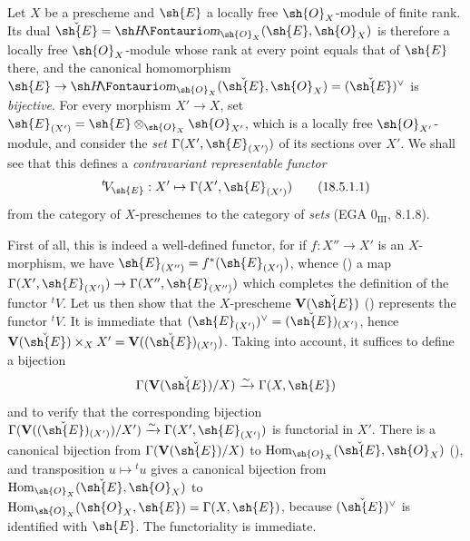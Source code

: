 \begin{env}[18.5.1]
\label{IV.18.5.1}
Let $X$ be a prescheme and $\sh{E}$ a locally free $\sh{O}_X$-module of finite rank.
Its dual $\check{\sh{E}}=\shHom_{\sh{O}_X}(\sh{E},\sh{O}_X)$ is therefore a locally free $\sh{O}_X$-module whose rank at every point equals that of $\sh{E}$ there, and the canonical homomorphism $\sh{E}\to\shHom_{\sh{O}_X}(\check{\sh{E}},\sh{O}_X)=(\check{\sh{E}})^\vee$ is \emph{bijective}.
For every morphism $X'\to X$, set $\sh{E}_{(X')}=\sh{E}\otimes_{\sh{O}_X}\sh{O}_{X'}$, which is a locally free $\sh{O}_{X'}$-module, and consider the \emph{set} $\Gamma(X',\sh{E}_{(X')})$ of its sections over $X'$.
We shall see that this defines a \emph{contravariant representable functor}
\[
\label{IV.18.5.1.1}
{}^t\! V_{\sh{E}}:X'\mapsto\Gamma(X',\sh{E}_{(X')})
\tag{18.5.1.1}
\]
from the category of $X$-preschemes to the category of \emph{sets} (EGA $0_{\mathrm{III}}$, 8.1.8).

First of all, this is indeed a well-defined functor, for if $f:X''\to X'$ is an $X$-morphism, we have $\sh{E}_{(X'')}=f^*(\sh{E}_{(X')})$, whence () a map $\Gamma(X',\sh{E}_{(X')})\to\Gamma(X'',\sh{E}_{(X'')})$ which completes the definition of the functor ${}^t\! V$.
Let us then show that the $X$-prescheme $\mathbf{V}(\check{\sh{E}})$ () represents the functor ${}^t\! V$.
It is immediate that $(\sh{E}_{(X')})^\vee=(\check{\sh{E}})_{(X')}$, hence $\mathbf{V}(\check{\sh{E}})\times_X X'=\mathbf{V}((\check{\sh{E}})_{(X')})$.
Taking  into account, it suffices to define a bijection
\[
\Gamma(\mathbf{V}(\check{\sh{E}})/X)\xrightarrow{\sim}\Gamma(X,\sh{E})
\]
and to verify that the corresponding bijection $\Gamma(\mathbf{V}((\check{\sh{E}})_{(X')})/X')\xrightarrow{\sim}\Gamma(X',\sh{E}_{(X')})$ is functorial in $X'$.
There is a canonical bijection from $\Gamma(\mathbf{V}(\check{\sh{E}})/X)$ to $\operatorname{Hom}_{\sh{O}_X}(\check{\sh{E}},\sh{O}_X)$ (), and transposition $u\mapsto{}^t u$ gives a canonical bijection from $\operatorname{Hom}_{\sh{O}_X}(\check{\sh{E}},\sh{O}_X)$ to $\operatorname{Hom}_{\sh{O}_X}(\sh{O}_X,\sh{E})=\Gamma(X,\sh{E})$, because $(\check{\sh{E}})^\vee$ is identified with $\sh{E}$.
The functoriality is immediate.


\end{env}
